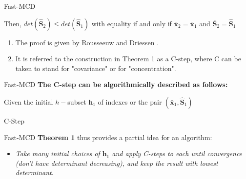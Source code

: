 \documentclass[newPxFont, numfooter, sectionpages]{beamer}
\begin{document}
\begin{frame}[c]{Fast-MCD}
	
	Then, $det(\boldsymbol{\hat{S}}_2) \leq det(\boldsymbol{\hat{S}}_1)$ with equality if and only if $\boldsymbol{\bar{x}}_2 = \boldsymbol{\bar{x}}_1$ and $\boldsymbol{\bar{S}}_2 = \boldsymbol{\hat{S}}_1$

	\begin{enumerate}
		\item The proof is given by Rousseeuw and Driessen \cite{rousseeuw1999fast}.
		\item \label{item:cstep}It is referred to the construction in Theorem 1 as a C-step, where C can be taken to stand for "covariance" or for "concentration".
	\end{enumerate}

\end{frame}

\begin{frame}[c]{Fast-MCD}
	\textbf{The C-step can be algorithmically described as follows:}
	\begin{algorithm}[H]\label{alg:alg01}
		\scriptsize
		\SetAlgoLined
		Given the initial $h-$subset $\boldsymbol{h}_1$ of indexes or the pair $(\boldsymbol{\bar{x}}_1, \boldsymbol{\hat{S}}_1)$\;
		\caption{C-Step}
	\end{algorithm}
\end{frame}

\begin{frame}[c]{Fast-MCD}
	\textbf{Theorem 1} thus provides a partial idea for an algorithm: 
		\begin{itemize}
			\item \textit{Take many initial choices of $\boldsymbol{h}_1$ and apply C-steps to each until convergence (don't have determinant decreasing), and keep the result with lowest determinant}.
		\end{itemize}
\end{frame}
\end{document}
